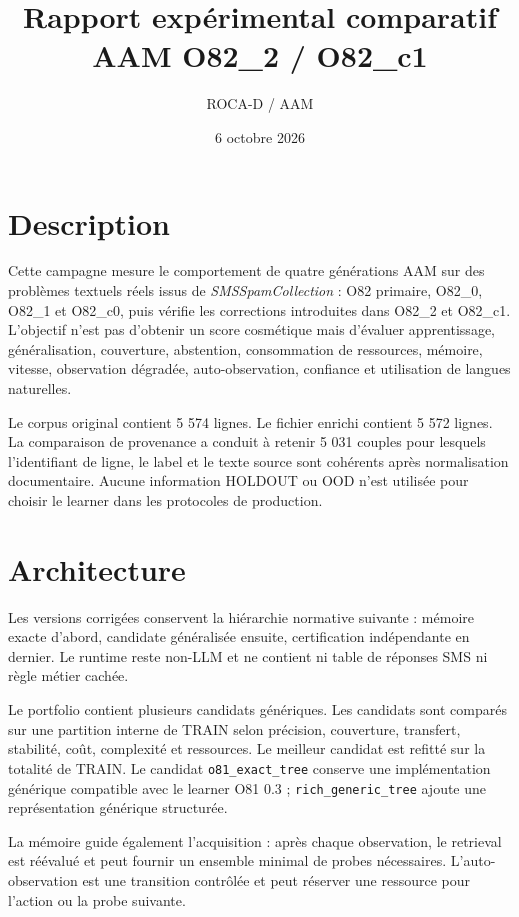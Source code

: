 \documentclass[11pt,a4paper]{report}
\title{Rapport expérimental comparatif AAM O82\_2 / O82\_c1}
\author{ROCA-D / AAM}
\date{6 octobre 2026}
\begin{document}
\sloppy
\setlength{\emergencystretch}{2em}
\maketitle
\tableofcontents

\chapter{Description}
Cette campagne mesure le comportement de quatre générations AAM sur des problèmes textuels réels issus de \emph{SMSSpamCollection} : O82 primaire, O82\_0, O82\_1 et O82\_c0, puis vérifie les corrections introduites dans O82\_2 et O82\_c1. L'objectif n'est pas d'obtenir un score cosmétique mais d'évaluer apprentissage, généralisation, couverture, abstention, consommation de ressources, mémoire, vitesse, observation dégradée, auto-observation, confiance et utilisation de langues naturelles.

Le corpus original contient 5 574 lignes. Le fichier enrichi contient 5 572 lignes. La comparaison de provenance a conduit à retenir 5 031 couples pour lesquels l'identifiant de ligne, le label et le texte source sont cohérents après normalisation documentaire. Aucune information HOLDOUT ou OOD n'est utilisée pour choisir le learner dans les protocoles de production.

\chapter{Architecture}
Les versions corrigées conservent la hiérarchie normative suivante : mémoire exacte d'abord, candidate généralisée ensuite, certification indépendante en dernier. Le runtime reste non-LLM et ne contient ni table de réponses SMS ni règle métier cachée.

Le portfolio contient plusieurs candidats génériques. Les candidats sont comparés sur une partition interne de TRAIN selon précision, couverture, transfert, stabilité, coût, complexité et ressources. Le meilleur candidat est refitté sur la totalité de TRAIN. Le candidat \texttt{o81\_exact\_tree} conserve une implémentation générique compatible avec le learner O81 0.3 ; \texttt{rich\_generic\_tree} ajoute une représentation générique structurée.

La mémoire guide également l'acquisition : après chaque observation, le retrieval est réévalué et peut fournir un ensemble minimal de probes nécessaires. L'auto-observation est une transition contrôlée et peut réserver une ressource pour l'action ou la probe suivante.
\end{document}
